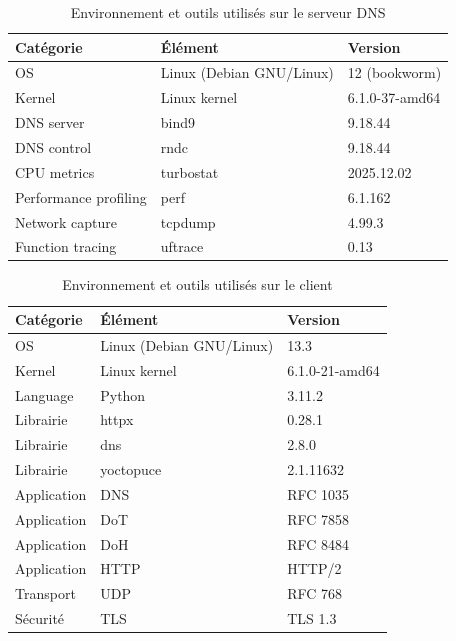 \documentclass[12pt, a4paper]{report}
\begin{document}
	\begin{table}[H]
		\centering
		\begin{tabular}{lll}
			\toprule
			\textbf{Catégorie} & \textbf{Élément} & \textbf{Version} \\
			\midrule
			OS & Linux (Debian GNU/Linux) & 12 (bookworm) \\
			Kernel & Linux kernel & 6.1.0-37-amd64 \\
			DNS server & \gls{bind9} & 9.18.44 \\
			DNS control & rndc & 9.18.44 \\
			CPU metrics & turbostat & 2025.12.02 \\
			Performance profiling & perf & 6.1.162 \\
			Network capture & tcpdump & 4.99.3 \\
			Function tracing & uftrace & 0.13 \\
			\bottomrule
		\end{tabular}
		\caption{Environnement et outils utilisés sur le serveur DNS}
		\label{tab:dns_env}
	\end{table}
	
	\begin{table}[H]
		\centering
		\begin{tabular}{lll}
			\toprule
			\textbf{Catégorie} & \textbf{Élément} & \textbf{Version} \\
			\midrule
			OS & Linux (Debian GNU/Linux) & 13.3 \\
			Kernel & Linux kernel & 6.1.0-21-amd64 \\
			Language & Python & 3.11.2 \\
			\midrule
			Librairie & httpx & 0.28.1 \\
			Librairie & dns & 2.8.0 \\
			Librairie & yoctopuce & 2.1.11632 \\
			\midrule
			Application & DNS & RFC 1035 \\
			Application & DoT & RFC 7858 \\
			Application & DoH & RFC 8484 \\
			Application & HTTP & HTTP/2 \\
			Transport & UDP & RFC 768 \\
			Sécurité & TLS & TLS 1.3 \\
			\bottomrule
		\end{tabular}
		\caption{Environnement et outils utilisés sur le client}
		\label{tab:client_env}
	\end{table}
\end{document}
